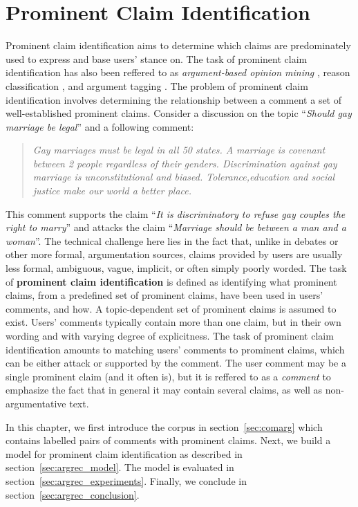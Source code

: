 \chapter{Prominent Claim Identification}
\label{chap:argrec}

Prominent claim identification aims to determine which claims are predominately
used to express and base users' stance on. The task of prominent claim
identification has also been reffered to as \textit{argument-based opinion mining}
\citep{boltuzic2014back}, reason classification \citep{hasan2014you}, and
argument tagging \citep{sobhani2015argumentation}. 
The problem of prominent claim identification involves determining
the relationship between a comment a set of well-established prominent claims. 
Consider a discussion on the topic ``\emph{Should gay marriage be legal}''
and a following comment: 
\begin{quote}
\emph{
Gay marriages must be legal in all 50 states. A marriage is covenant
between 2 people regardless of their genders. Discrimination against
gay marriage is unconstitutional and biased. Tolerance,education and
social justice make our world a better place.
}
\end{quote}
This comment supports the claim ``\emph{It is discriminatory to refuse
gay couples the right to marry}'' and attacks the claim
``\emph{Marriage should be between a man and a woman}''. 
The technical challenge here lies in the fact that, unlike
in debates or other more formal, argumentation sources, 
claims provided by users are usually less formal, ambiguous, vague, 
implicit, or often simply poorly worded. 
The task of \textbf{prominent claim identification} is defined 
as identifying what prominent claims, from a predefined set of prominent claims, 
have been used in users' comments, and how. 
A topic-dependent set of prominent claims is assumed to exist. 
Users' comments typically contain more than one claim, but in their 
own wording and with varying degree of explicitness. 
The task of prominent claim identification amounts to matching
users' comments to prominent claims, which can be either attack or 
supported by the comment. 
The user comment may be a single prominent claim (and it often is), but it 
is reffered to as a \textit{comment} to emphasize the fact that in general 
it may contain several claims, as well as non-argumentative text. 

In this chapter, we first introduce the \ComArg corpus in section~\ref{sec:comarg}
which contains labelled pairs of comments with prominent claims. Next, 
we build a model for prominent claim identification as described in 
section~\ref{sec:argrec_model}. The model is evaluated in 
section~\ref{sec:argrec_experiments}. Finally, we conclude in 
section~\ref{sec:argrec_conclusion}.

